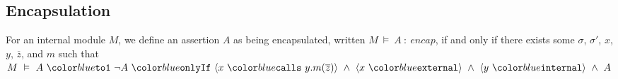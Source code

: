 \documentclass[acmsmall,review,anonymous]{acmart}\settopmatter{printfolios=true,printccs=false,printacmref=false}
\begin{document}
\subsection{Encapsulation}

\begin{definition}[Encapsulation]
For an internal module $M$, we define an assertion $A$ as being 
encapsulated, written $M\ \vDash\ A\ :\ encap$, if and only if
there exists some $\sigma$, $\sigma'$, $x$, $y$, $\overline{z}$, and $m$ such that 
$M\ \vDash\ \onlyIfSingle{A}{\neg A}{\calls{x}{y}{m}{\overline{z}}\ \wedge\ \external{x}\ \wedge\ \internal{y}\ \wedge\ A}$
\end{definition}
\end{document}
